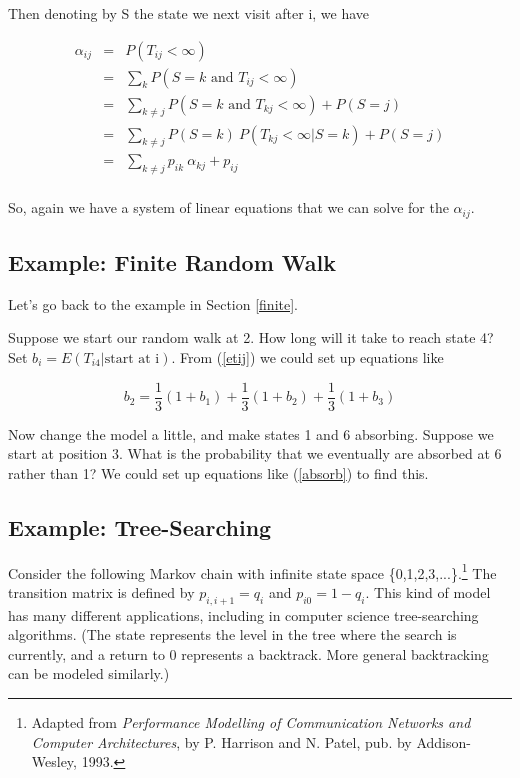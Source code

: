 Then denoting by S the state we next visit after i, we have

\begin{eqnarray}
\label{absorb}
\alpha_{ij} &=& P(T_{ij} < \infty) \\
&=& \sum_{k} P(S = k \textrm{ and } T_{ij} < \infty) \\
&=& \sum_{k \neq j} P(S = k \textrm{ and } T_{kj} < \infty) + P(S = j) \\
&=& \sum_{k \neq j} P(S = k) ~ P(T_{kj} < \infty | S = k) + P(S = j) \\
&=& \sum_{k \neq j} p_{ik} ~ \alpha_{kj} + p_{ij} \\
\end{eqnarray}

So, again we have a system of linear equations that we can solve for the
$\alpha_{ij}$.

\subsection{Example:  Finite Random Walk}

Let's go back to the example in Section \ref{finite}.

Suppose we start our random walk at 2.  How long will it take to reach
state 4?  Set $b_i = E(T_{i4}|\textrm{start at i})$.  From (\ref{etij})
we could set up equations like

\begin{equation}
b_2 = \frac{1}{3} (1+b_1) + \frac{1}{3} (1+b_2) + \frac{1}{3} (1+b_3)
\end{equation}

Now change the model a little, and make states 1 and 6 absorbing.
Suppose we start at position 3.  What is the probability that we
eventually are absorbed at 6 rather than 1?  We could set up equations
like (\ref{absorb}) to find this. 

\subsection{Example:  Tree-Searching}
\label{treesearch}

Consider the following Markov chain with infinite state space
\{0,1,2,3,...\}.\footnote{Adapted from {\it Performance Modelling of
Communication Networks and Computer Architectures}, by P. Harrison and
N. Patel, pub. by Addison-Wesley, 1993.} The transition matrix is
defined by $p_{i,i+1}=q_{i}$ and $p_{i0}=1-q_{i}$. This kind of model
has many different applications, including in computer science
tree-searching algorithms.  (The state represents the level in the tree
where the search is currently, and a return to 0 represents a backtrack.
More general backtracking can be modeled similarly.)


